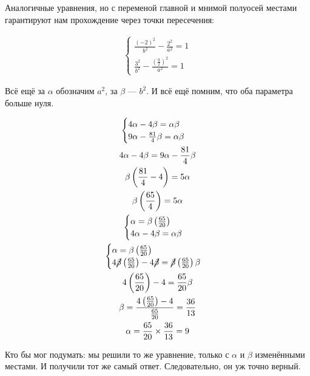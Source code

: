 \documentclass[12pt, a4paper]{article}
\begin{document}
    Аналогичные уравнения, но с переменой главной и мнимой полуосей местами 
    гарантируют нам прохождение через точки пересечения:
    
    \begin{gather}
        \begin{cases}
            \frac{(-2)^2}{b^2} - \frac{2^2}{a^2} = 1 \\
            \frac{3^2}{b^2} - \frac{\left(\frac{9}{2}\right)^2}{a^2} = 1
        \end{cases}
    \end{gather}

    Всё ещё за $\alpha$ обозначим $a^2$, за $\beta$ — $b^2$. И всё ещё помним, что оба параметра больше нуля.

    \begin{gather}
        \begin{cases}
            4\alpha - 4\beta = \alpha\beta \\
            9\alpha - \frac{81}{4} \beta = \alpha\beta
        \end{cases} \\
        4\alpha - 4\beta = 9\alpha - \frac{81}{4} \beta \\
        \beta \left( \frac{81}{4} - 4 \right) = 5\alpha \\
        \beta \left( \frac{65}{4} \right) = 5\alpha \\
        \begin{cases}
            \alpha = \beta \left( \frac{65}{20} \right) \\
            4\alpha - 4\beta = \alpha\beta
        \end{cases} \\
        \begin{cases}
            \alpha = \beta \left( \frac{65}{20} \right) \\
            4 \cancel{\beta} \left( \frac{65}{20} \right) - 4\cancel{\beta} = \cancel{\beta} \left( \frac{65}{20} \right)\beta
        \end{cases} \\
        4 \left( \frac{65}{20} \right) - 4 = \frac{65}{20} \beta \\
        \beta = \frac{4 \left( \frac{65}{20} \right) - 4}{\frac{65}{20}} = \frac{36}{13} \\
        \alpha = \frac{65}{20} \times \frac{36}{13} = 9
    \end{gather}

    Кто бы мог подумать: мы решили то же уравнение, только с $\alpha$ и $\beta$ изменёнными местами.
    И получили тот же самый ответ. Следовательно, он уж точно верный.
\end{document}
